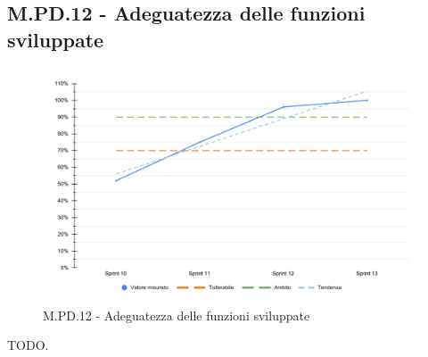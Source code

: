 \subsection{M.PD.12 - Adeguatezza delle funzioni sviluppate}

\begin{figure}[H]
  \centering
  \includegraphics[width=\textwidth]{assets/adeguatezza_funzioni.pdf}
  \caption{M.PD.12 - Adeguatezza delle funzioni sviluppate}
\end{figure}

\par TODO.